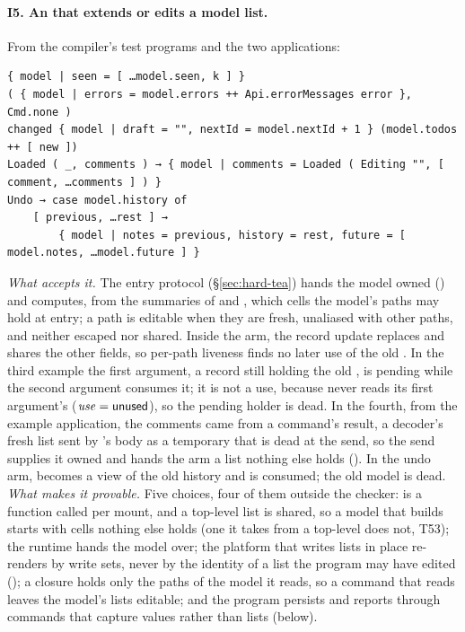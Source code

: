 \paragraph{I5. An  that extends or edits a model list.} From the compiler's test programs
and the two applications:
\begin{Verbatim}
{ model | seen = [ …model.seen, k ] }
( { model | errors = model.errors ++ Api.errorMessages error }, Cmd.none )
changed { model | draft = "", nextId = model.nextId + 1 } (model.todos ++ [ new ])
Loaded ( _, comments ) → { model | comments = Loaded ( Editing "", [ comment, …comments ] ) }
Undo → case model.history of
    [ previous, …rest ] →
        { model | notes = previous, history = rest, future = [ model.notes, …model.future ] }
\end{Verbatim}
\emph{What accepts it.} The entry protocol (\S\ref{sec:hard-tea}) hands  the model owned
() and computes, from the summaries of  and , which cells the model's
paths may hold at entry; a path is editable when they are fresh, unaliased with other paths, and neither
escaped nor shared. Inside the arm, the record update replaces  and shares the other fields, so
per-path liveness finds no later use of the old . In the third example the first
argument, a record still holding the old , is pending while the second argument consumes it;
it is not a use, because  never reads its first argument's 
($\mathit{use} = \mathsf{unused}$), so the pending holder is dead. In the fourth, from the example application,
the comments came from a command's result, a decoder's fresh list sent by 's body as a
temporary that is dead at the send, so the send supplies it owned and hands the arm a list nothing else
holds (). In the undo arm,
 becomes a view of the old history and  is consumed; the old model is dead.
\emph{What makes it provable.} Five choices, four of them outside the checker:  is a function
called per mount, and a top-level list is shared, so a model that  builds starts with cells
nothing else holds (one it takes from a top-level  does not, T53); the
runtime hands the model over; the platform that writes lists in place re-renders by write sets, never by
the identity of a list the program may have edited (); a closure holds only the paths of the model
it reads, so a command that reads  leaves the model's lists editable; and the program
persists and reports through commands that capture values rather than lists (below).

